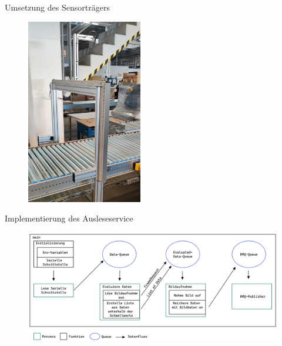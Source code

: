 \documentclass[10pt,ngerman]{beamer}
\begin{document}
\begin{frame}[fragile]{Umsetzung des Sensorträgers}
  \begin{figure}[htpb]
    \centering
    \includegraphics[width=0.45\textwidth]{pics/Sensortraeger_cropped.jpeg}
  \end{figure}
\end{frame}



\begin{frame}[fragile]{Implementierung des Ausleseservice}
  \begin{figure}[htpb]
    \centering
    \includegraphics[width=1\textwidth]{pics/DataReaderDataFlow.png}
  \end{figure}
\end{frame}
\end{document}
